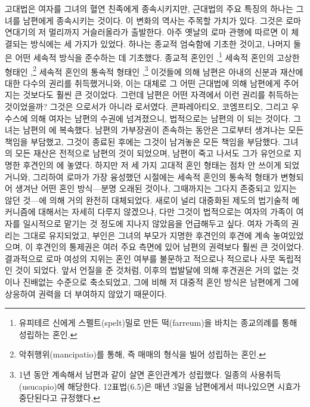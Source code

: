 고대법은 여자를 그녀의 혈연 친족에게 종속시키지만,
근대법의 주요 특징의 하나는 그녀를 남편에게 종속시키는 것이다.
이 변화의 역사는 주목할 가치가 있다.
그것은 로마 연대기의 저 멀리까지 거슬러올라가 출발한다.
아주 옛날의 로마 관행에 따르면
이 체결되는
방식에는
세 가지가
있었다.
하나는 종교적 엄숙함에 기초한 것이고,
나머지 둘은 어떤 세속적 방식을 준수하는 데 기초했다.
종교적 혼인인 ,\footnote{%
  유피테르 신에게 스펠트(spelt)밀로 만든 떡(farreum)을 바치는 종교의례를 통해
  성립하는 혼인. }
세속적 혼인의 고상한 형태인 ,\footnote{%
  악취행위(mancipatio)를 통해, 즉 매매의 형식을 빌어 성립하는 혼인. }
세속적 혼인의 통속적 형태인 ,\footnote{%
  1년 동안 계속해서 남편과 같이 살면 혼인관계가 성립했다.
  일종의 사용취득(usucapio)에 해당한다.
  12표법(6.5)은 매년 3일을 남편에게서 떠나있으면 시효가 중단된다고 규정했다. }
이것들에 의해 남편은 아내의 신분과 재산에 대한 다수의 권리를 취득했거니와,
이는 대체로 그 어떤 근대법에 의해 남편에게 주어지는 것보다도 훨씬 큰 것이었다.
그런데 남편은 어떤 자격에서 이런 권리를 취득하는 것이었을까?
그것은 으로서가 아니라 로서였다.
콘파레아티오, 코엠프티오, 그리고 우수스에 의해
여자는 남편의 수권에 넘겨졌으니,
법적으로는 남편의 이 되는 것이다.
그녀는 남편의 에 복속했다.
남편의 가부장권이 존속하는 동안은 그로부터 생겨나는 모든 책임을 부담했고,
그것이 종료된 후에는 그것이 남겨놓은 모든 책임을 부담했다.
그녀의 모든 재산은 전적으로 남편의 것이 되었으며,
남편이 죽고 나서도 그가 유언으로 지명한 후견인의 에 놓였다.
하지만
저 세 가지 고대적 혼인 형태는 점차 안 쓰이게 되었거니와,
그리하여 로마가 가장 융성했던 시절에는
세속적 혼인의 통속적 형태가 변형되어 생겨난 어떤 혼인 방식---분명
오래된 것이나, 그때까지는 그다지 존중되고 있지는 않던 것---에 의해
거의 완전히 대체되었다.
새로이 널리 대중화된 제도의 법기술적 메커니즘에 대해서는 자세히 다루지
않겠으나, 다만 그것이 법적으로는
여자의 가족이 여자를 일시적으로 맡기는 것 정도에
지나지 않았음을 언급해두고 싶다.
여자 가족의 권리는 그대로 유지되었고,
부인은 그녀의 부모가 지명한 후견인의 후견에 계속 놓여있었으며,
이 후견인의 통제권은
여러 주요 측면에 있어
남편의 권력보다 훨씬 큰 것이었다.
결과적으로 로마 여성의 지위는
혼인 여부를 불문하고
적으로나 적으로나 사뭇 독립적인 것이 되었다.
앞서 언질을 준 것처럼, 이후의 법발달에 의해
후견권은 거의 없는 것이나 진배없는 수준으로 축소되었고,
그에 비해 저 대중적 혼인 방식은 남편에게 그에 상응하여
권력을 더 부여하지 않았기 때문이다.
